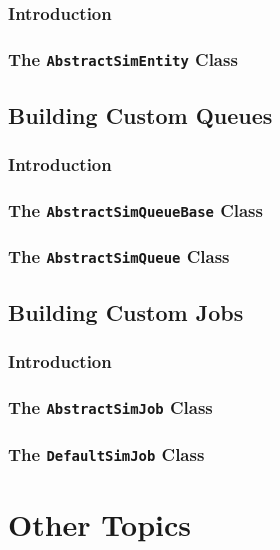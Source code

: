 \documentclass[12pt]{book}
\begin{document}
\subsection{Introduction}

\subsection{The \lstinline{AbstractSimEntity} Class}

\section{Building Custom Queues}

\subsection{Introduction}

\subsection{The \lstinline{AbstractSimQueueBase} Class}

\subsection{The \lstinline{AbstractSimQueue} Class}

\section{Building Custom Jobs}

\subsection{Introduction}

\subsection{The \lstinline{AbstractSimJob} Class}

\subsection{The \lstinline{DefaultSimJob} Class}

\chapter{Other Topics}
\end{document}
